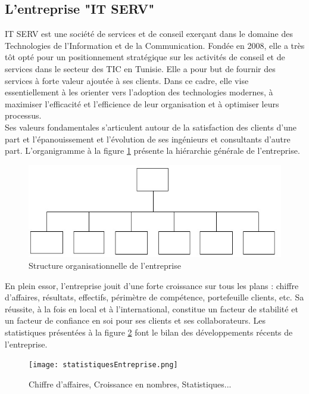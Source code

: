 \begin{spacing}{1.5}
\subsection{L'entreprise "IT SERV"}
IT SERV est une société de services et de conseil exerçant dans le domaine des Technologies de l'Information et de la Communication.
Fondée en 2008, elle a très tôt opté pour un positionnement stratégique sur les activités de conseil et de services dans le secteur des TIC en Tunisie. Elle a pour but de fournir des services à forte valeur ajoutée à ses clients. Dans ce cadre, elle vise essentiellement à les orienter vers l'adoption des technologies modernes, à maximiser l'efficacité et l'efficience de leur organisation et à optimiser leurs processus.\\
Ses valeurs fondamentales s'articulent autour de la satisfaction des clients d'une part et l'épanouissement et l'évolution de ses ingénieurs et consultants d'autre part. L'organigramme à la figure \ref{fig:organigramme} présente la hiérarchie générale de l'entreprise.\\

\begin{figure}[h]
\centering
\includegraphics[width=0.9\linewidth]{organigramme.jpg}
\caption{Structure organisationnelle de l'entreprise}
\label{fig:organigramme}
\end{figure}

En plein essor, l'entreprise jouit d'une forte croissance sur tous les plans : chiffre d'affaires, résultats, effectifs, périmètre de compétence, portefeuille clients, etc. Sa réussite, à la fois en local et à l'international, constitue un facteur de stabilité et un facteur de confiance en soi pour ses clients et ses collaborateurs. Les statistiques présentées à la figure \ref{statistiquesCroissance} font le bilan des développements récents de l'entreprise.\\

\begin{figure}[h]
\centering
\texttt{[image: statistiquesEntreprise.png]}
\caption{Chiffre d'affaires, Croissance en nombres, Statistiques...}
\label{statistiquesCroissance}
\end{figure}


\end{spacing}
